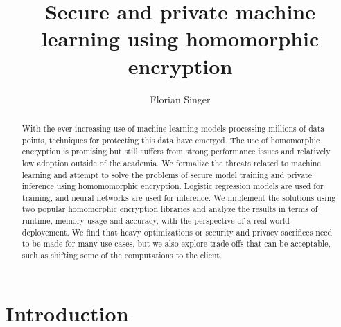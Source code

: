 \documentclass[a4paper,11pt,oneside]{report}
\title{Secure and private machine learning using homomorphic encryption}
\author{Florian Singer}
\begin{document}
\maketitle

\begin{abstract}

With the ever increasing use of machine learning models processing millions of data points, techniques for protecting this data have emerged.
The use of homomorphic encryption is promising but still suffers from strong performance issues and relatively low adoption outside of the academia.
We formalize the threats related to machine learning and attempt to solve the problems of secure model training and private inference using homomomorphic encryption.
Logistic regression models are used for training, and neural networks are used for inference.
We implement the solutions using two popular homomorphic encryption libraries and analyze the results in terms of runtime, memory usage and accuracy, with the perspective of a real-world deployement.
We find that heavy optimizations or security and privacy sacrifices need to be made for many use-cases, but we also explore trade-offs that can be acceptable, such as shifting some of the computations to the client.

\end{abstract}

\maketoc


\chapter{Introduction}

\end{document}
